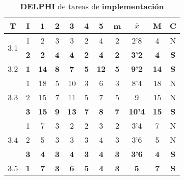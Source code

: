 \documentclass[11pt,a4paper,spanish,twoside]{report}
\begin{document}
\begin{table}[!h]
\centering
  \begin{tabular}{|c|c||c|c|c|c|c||c|c|c||c|}
    \hline 
    \textbf{T} & \textbf{I} & \textbf{1} &
    \textbf{2} & \textbf{3} & \textbf{4} & \textbf{5} & \textbf{m}
    &\textbf{$\bar{x}$} &\textbf{M} & \textbf{C}\\    
    \hline \hline

    \multirow{2}{*}{3.1}& 1 & 2 & 3 & 3 & 2 & 4 & 2 & 2'8 & 4 & N \\
    & \textbf{2} & \textbf{2} & \textbf{4} & \textbf{4} & \textbf{2} &
    \textbf{4} & \textbf{2} & \textbf{3'2} & \textbf{4} & \textbf{S} \\
    \hline

    3.2 & \textbf{1} & \textbf{14} & \textbf{8} & \textbf{7} &
    \textbf{5} & \textbf{12} & \textbf{5} & \textbf{9'2} & \textbf{14} &
    \textbf{S} \\ 
    \hline

    \multirow{3}{*}{3.3}
    & 1 & 18 & 5 & 10 & 3 & 6 & 3 & 8'4 & 18 & N \\
    & 2 & 15 & 7 & 11 & 5 & 7 & 5 & 9   & 15 & N \\
    & \textbf{3} & \textbf{15} & \textbf{9} & \textbf{13} & \textbf{7} &
    \textbf{8} & \textbf{7} & \textbf{10'4} & \textbf{15} & \textbf{S} \\
    \hline

    \multirow{3}{*}{3.4}
    & 1 & 7 & 3 & 2 & 2 & 3 & 2 & 3'4 & 7 & N \\
    & 2 & 5 & 3 & 3 & 3 & 4 & 3 & 3'6 & 5 & N \\
    & \textbf{3} & \textbf{4} & \textbf{3} & \textbf{4} & \textbf{3} &
    \textbf{4} & \textbf{3} & \textbf{3'6} & \textbf{4} & \textbf{S} \\
    \hline

    3.5 & \textbf{1} & \textbf{7} & \textbf{3} & \textbf{6} &
    \textbf{5} & \textbf{4} & \textbf{3} & \textbf{5} &\textbf{7} &
    \textbf{S} \\ 
    \hline

  \end{tabular}
  \caption{\textbf{DELPHI} de tareas de \textbf{implementación}}
  \label{Tab:DELPHIimp}
\end{table}
\end{document}
